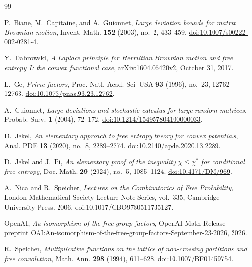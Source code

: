 \clearpage
\begin{thebibliography}{99}
\raggedright
{}
P.~Biane, M.~Capitaine, and A.~Guionnet,
\emph{Large deviation bounds for matrix Brownian motion},
Invent. Math. \textbf{152} (2003), no.~2, 433--459.
\href{https://doi.org/10.1007/s00222-002-0281-4}{doi:10.1007/s00222-002-0281-4}.

Y.~Dabrowski,
\emph{A Laplace principle for Hermitian Brownian motion and free entropy I:
the convex functional case},
\href{https://arxiv.org/abs/1604.06420v2}{arXiv:1604.06420v2},
October 31, 2017.

L.~Ge,
\emph{Prime factors},
Proc. Natl. Acad. Sci. USA \textbf{93} (1996), no.~23, 12762--12763.
\href{https://doi.org/10.1073/pnas.93.23.12762}{doi:10.1073/pnas.93.23.12762}.

A.~Guionnet,
\emph{Large deviations and stochastic calculus for large random matrices},
Probab. Surv. \textbf{1} (2004), 72--172.
\href{https://doi.org/10.1214/154957804100000033}{doi:10.1214/154957804100000033}.

D.~Jekel,
\emph{An elementary approach to free entropy theory for convex potentials},
Anal. PDE \textbf{13} (2020), no.~8, 2289--2374.
\href{https://doi.org/10.2140/apde.2020.13.2289}{doi:10.2140/apde.2020.13.2289}.

D.~Jekel and J.~Pi,
\emph{An elementary proof of the inequality $\chi\leq\chi^*$ for
conditional free entropy},
Doc. Math. \textbf{29} (2024), no.~5, 1085--1124.
\href{https://doi.org/10.4171/DM/969}{doi:10.4171/DM/969}.

A.~Nica and R.~Speicher,
\emph{Lectures on the Combinatorics of Free Probability},
London Mathematical Society Lecture Note Series, vol.~335,
Cambridge University Press, 2006.
\href{https://doi.org/10.1017/CBO9780511735127}{doi:10.1017/CBO9780511735127}.

OpenAI,
\emph{An isomorphism of the free group factors},
OpenAI Math Release preprint
\href{https://github.com/openai/math/blob/main/preprints/An-isomorphism-of-the-free-group-factors-September-23-2026/An-isomorphism-of-the-free-group-factors-September-23-2026.pdf}{OAI:An-isomorphism-of-the-free-group-factors-September-23-2026},
2026.

R.~Speicher,
\emph{Multiplicative functions on the lattice of non-crossing partitions
and free convolution},
Math. Ann. \textbf{298} (1994), 611--628.
\href{https://doi.org/10.1007/BF01459754}{doi:10.1007/BF01459754}.


\end{thebibliography}

